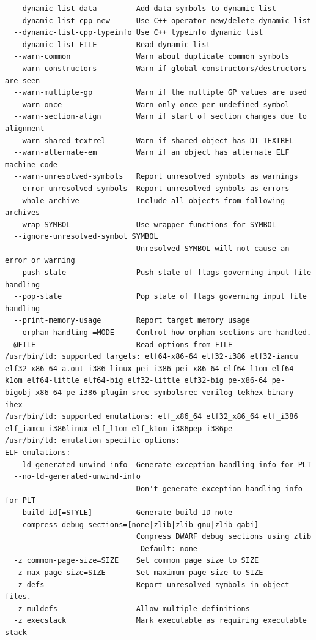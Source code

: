 \documentclass{article}
\begin{document}
\begin{lstlisting}
  --dynamic-list-data         Add data symbols to dynamic list
  --dynamic-list-cpp-new      Use C++ operator new/delete dynamic list
  --dynamic-list-cpp-typeinfo Use C++ typeinfo dynamic list
  --dynamic-list FILE         Read dynamic list
  --warn-common               Warn about duplicate common symbols
  --warn-constructors         Warn if global constructors/destructors are seen
  --warn-multiple-gp          Warn if the multiple GP values are used
  --warn-once                 Warn only once per undefined symbol
  --warn-section-align        Warn if start of section changes due to alignment
  --warn-shared-textrel       Warn if shared object has DT_TEXTREL
  --warn-alternate-em         Warn if an object has alternate ELF machine code
  --warn-unresolved-symbols   Report unresolved symbols as warnings
  --error-unresolved-symbols  Report unresolved symbols as errors
  --whole-archive             Include all objects from following archives
  --wrap SYMBOL               Use wrapper functions for SYMBOL
  --ignore-unresolved-symbol SYMBOL
                              Unresolved SYMBOL will not cause an error or warning
  --push-state                Push state of flags governing input file handling
  --pop-state                 Pop state of flags governing input file handling
  --print-memory-usage        Report target memory usage
  --orphan-handling =MODE     Control how orphan sections are handled.
  @FILE                       Read options from FILE
/usr/bin/ld: supported targets: elf64-x86-64 elf32-i386 elf32-iamcu elf32-x86-64 a.out-i386-linux pei-i386 pei-x86-64 elf64-l1om elf64-k1om elf64-little elf64-big elf32-little elf32-big pe-x86-64 pe-bigobj-x86-64 pe-i386 plugin srec symbolsrec verilog tekhex binary ihex
/usr/bin/ld: supported emulations: elf_x86_64 elf32_x86_64 elf_i386 elf_iamcu i386linux elf_l1om elf_k1om i386pep i386pe
/usr/bin/ld: emulation specific options:
ELF emulations:
  --ld-generated-unwind-info  Generate exception handling info for PLT
  --no-ld-generated-unwind-info
                              Don't generate exception handling info for PLT
  --build-id[=STYLE]          Generate build ID note
  --compress-debug-sections=[none|zlib|zlib-gnu|zlib-gabi]
                              Compress DWARF debug sections using zlib
                               Default: none
  -z common-page-size=SIZE    Set common page size to SIZE
  -z max-page-size=SIZE       Set maximum page size to SIZE
  -z defs                     Report unresolved symbols in object files.
  -z muldefs                  Allow multiple definitions
  -z execstack                Mark executable as requiring executable stack

\end{lstlisting}
\end{document}
